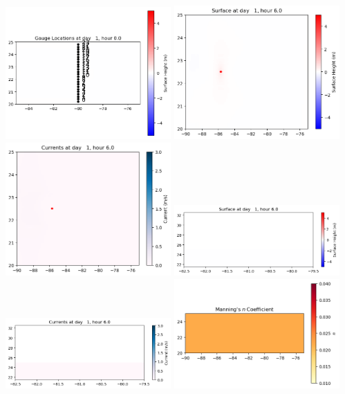 \documentclass[11pt]{article}
\begin{document}
\includegraphics[width=0.475\textwidth]{frame0004fig1008.png}
\vskip 10pt 
\includegraphics[width=0.475\textwidth]{frame0005fig1001.png}
\includegraphics[width=0.475\textwidth]{frame0005fig1002.png}
\vskip 10pt 
\includegraphics[width=0.475\textwidth]{frame0005fig1003.png}
\includegraphics[width=0.475\textwidth]{frame0005fig1004.png}
\vskip 10pt 
\includegraphics[width=0.475\textwidth]{frame0005fig1005.png}
\end{document}
